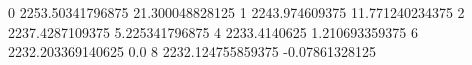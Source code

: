0 2253.50341796875 21.300048828125
1 2243.974609375 11.771240234375
2 2237.4287109375 5.225341796875
4 2233.4140625 1.210693359375
6 2232.203369140625 0.0
8 2232.124755859375 -0.07861328125
